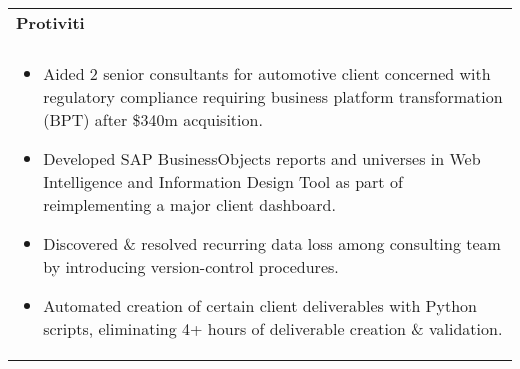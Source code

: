 \documentclass[letterpaper,10pt]{article} %
\begin{document}
\begin{tabular*}{\linewidth}{@{\extracolsep{\fill}} lr }
\textbf{Protiviti} & \scriptsize\bfseries\color{sectioncolour}{Boston, MA}\\
\footnotesize\bfseries\color{sectioncolour}{Technology Consulting Intern} & \scriptsize\bfseries\color{sectioncolour}{May 2024 - August 2024}\\
\multicolumn{2}{p{\linewidth}}{
    \scriptsize{\vspace{-0.1in}\begin{itemize}
        \item Aided 2 senior consultants for automotive client concerned with regulatory compliance requiring business platform transformation (BPT) after \$340m acquisition.
        \item Developed SAP BusinessObjects reports and universes in Web Intelligence and Information Design Tool as part of reimplementing a major client dashboard.
        \item Discovered \& resolved recurring data loss among consulting team by introducing version-control procedures.
        \item Automated creation of certain client deliverables with Python scripts, eliminating 4+ hours of deliverable creation \& validation.
    \end{itemize}\vspace{-0.1in}}
}\\


\end{tabular*}
\end{document}
